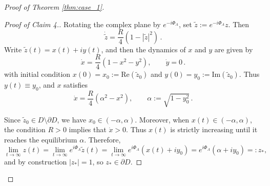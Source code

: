 \documentclass[10pt]{article}
\theoremstyle{definition}
\theoremstyle{definition}
\numberwithin{equation}{section}
\newcommand{\im}[1]{\mathrm{Im} \left(#1\right)}
\newcommand{\re}[1]{\mathrm{Re}\left(#1\right)}
\newcommand{\PhiA}{\Phi_{A}}
\newcommand{\wz}{\widetilde{z}}
\begin{document}
\begin{proof}[Proof of Theorem \ref{thm:case_1}]
\begin{proof}[Proof of Claim 4.]
Rotating the complex plane by $e^{-i\PhiA}$, set $\wz := e^{-i\PhiA} z$.
Then
\begin{equation*}
    \dot{\wz} = \frac{R}{4} (1 - |\wz|^2) \, .
\end{equation*}
Write $\wz(t) = x(t) + i y(t)$, and then the dynamics of $x$ and $y$ are given by
\begin{equation*}
\Dot{x} = \frac{R}{4} \left(1 - x^2 - y^2 \right), \qquad \Dot{y} = 0 \, .
\end{equation*}
with initial condition $x(0) = x_0 := \re{\wz_0}$ and $y(0) = y_0 := \im{\wz_0}$.
Thus $y(t) \equiv y_0$, and $x$ satisfies
\begin{equation*}
\Dot{x} = \frac{R}{4} \left( \alpha^2 - x^2 \right), \qquad \alpha := \sqrt{1 - y_0^2} \, .
\end{equation*}

Since $\wz_0 \in D \setminus \partial D$, we have $x_0 \in (-\alpha, \alpha)$. 
Moreover, when $x(t) \in (-\alpha, \alpha)$,
the condition $R > 0$ implies that $\Dot{x} > 0$.
Thus $x(t)$ is strictly increasing until it reaches the equilibrium $\alpha$.
Therefore, 
\begin{equation*}
\lim_{t \rightarrow \infty} z(t) = \lim_{t \rightarrow \infty} e^{i\PhiA} \wz(t) =  \lim_{t \rightarrow \infty} e^{i\PhiA} \left(  x(t) + i y_0 \right) = e^{i\PhiA} \left( \alpha + i y_0 \right) =: z_*,
\end{equation*}
and by construction $|z_*| = 1$, so $z_* \in \partial D$.
\end{proof}


\end{proof}
\end{document}
